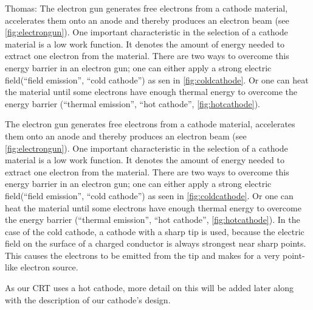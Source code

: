 Thomas: The electron gun generates free electrons from a cathode material, accelerates them onto an anode and thereby produces an electron beam (see \cref{fig:electrongun}). One important characteristic in the selection of a cathode material is a low work function. It denotes the amount of energy needed to extract one electron from the material. There are two ways to overcome this energy barrier in an electron gun; one can either apply a strong electric field(``field emission'', ``cold cathode'')  as sen in \cref{fig:coldcathode}.  Or one can heat the material until some electrons have enough thermal energy to overcome the energy barrier (``thermal emission'', ``hot cathode'', \cref{fig:hotcathode}).

The electron gun generates free electrons from a cathode material, accelerates them onto an anode and thereby produces an electron beam (see \cref{fig:electrongun}). One important characteristic in the selection of a cathode material is a low work function. It denotes the amount of energy needed to extract one electron from the material. There are two ways to overcome this energy barrier in an electron gun; one can either apply a strong electric field(``field emission'', ``cold cathode'')  as seen in \cref{fig:coldcathode}. Or one can heat the material until some electrons have enough thermal energy to overcome the energy barrier (``thermal emission'', ``hot cathode'', \cref{fig:hotcathode}).
In the case of the cold cathode, a cathode with a sharp tip is used, because  the electric field on the surface of a charged conductor is always strongest near sharp points. This causes the electrons to be emitted from the tip and makes for a very point-like electron source.


As our CRT uses a hot cathode, more detail on this will be added later along with the description of our cathode's design. 

